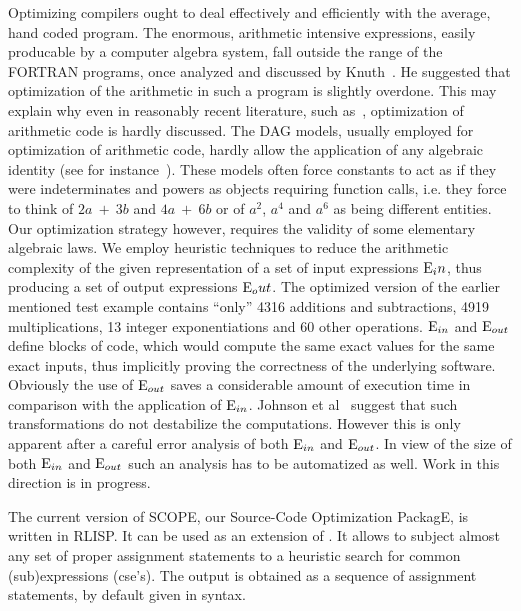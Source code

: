 Optimizing compilers ought to deal effectively and efficiently with
the average, hand coded program. The enormous, arithmetic intensive
expressions, easily producable by a computer algebra system, fall
outside the range of the FORTRAN programs, once analyzed and discussed
by Knuth~\cite{Knuth:71}. He suggested that optimization of the arithmetic in
such a program is slightly overdone. This may explain why even in
reasonably recent literature, such as~\cite{Aho:86}, optimization of arithmetic
code is hardly discussed. The DAG models, usually employed for
optimization of arithmetic code, hardly allow the application of any
algebraic identity (see for instance~\cite{Gonzales}). These models often force
constants to act as if they were indeterminates and powers as objects
requiring function calls, i.e. they force to think of $2a\ +\ 3b$ and
$4 a \ +\ 6b$ or of $a^2$, $a^{4}$ and $a^{6}$ as being different
entities.  Our optimization strategy however, requires the validity of
some elementary algebraic laws. We employ heuristic techniques to
reduce the arithmetic complexity of the given representation of a set
of input expressions $ {\rm E}_in$, thus producing a set of output
expressions ${\rm E}_out$. The optimized version of the earlier
mentioned test example contains ``only'' 4316 additions and
subtractions, 4919 multiplications, 13 integer exponentiations and 60
other operations.  ${\rm E}_{in}$ and ${\rm E}_{out}$ define blocks of
code, which would compute the same exact values for the same exact
inputs, thus implicitly proving the correctness of the underlying
software.  Obviously the use of ${\rm E}_{out}$ saves a considerable
amount of execution time in comparison with the application of ${\rm
E}_{in}$.  Johnson et al~\cite{Johnson:79} suggest that such
transformations do not destabilize the computations.  However this is only
apparent after a careful error analysis of both ${\rm E}_{in}$ and ${\rm
E}_{out}$.  In view of the size of both ${\rm E}_{in}$ and ${\rm E}_{out}$
such an analysis has to be automatized as well.  Work in this direction is
in progress.

The current version of SCOPE, our Source-Code Optimization PackagE, is
written in RLISP. It can be used as an extension of {\REDUCE}.  It
allows to subject almost any set of proper {\REDUCE} assignment
 
statements to a heuristic search for common (sub)expressions (cse's).
The output is obtained as a sequence of assignment statements, by
default given in {\REDUCE} syntax.

